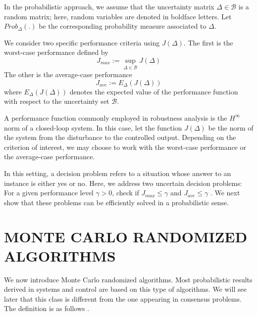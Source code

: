 \documentclass[12pt]{article}
\begin{document}
		\par
		In the probabilistic approach, we assume that the uncertainty matrix $\Delta \in \mathscr{B}$ is a random matrix; here, random variables are denoted in boldface letters. Let $Prob_{\Delta}(.)$ be the corresponding probability measure associated to $\Delta$.
		\par
		We consider two specific performance criteria using $J(\Delta )$. The first is the worst-case performance defined by 
		\begin{equation} 	
			J_{max}:= \sup_{\Delta \in \mathscr{B} }J(\Delta ) 
		\end{equation}
		The other is the average-case performance 
		\begin{equation*} 	
			J_{ave}:= E_{\Delta}(J(\Delta )) 
		\end{equation*}
		where $E_{\Delta}(J(\Delta ))$ denotes the expected value of the performance function with respect to the uncertainty set $\mathscr{B}$.
		\par
		A performance function commonly employed in robustness  analysis is the $H^{\infty }$ norm of a closed-loop system. In this case, let the function $J(\Delta)$ be the norm of the system from the disturbance to the controlled output. Depending on the criterion of interest, we may choose to work with the worst-case performance or the average-case performance.
		\par
		In this setting, a decision problem refers to a situation whose answer to an instance is either yes or no. Here, we address two uncertain decision problems: For a given performance level $\gamma > 0$, check if $J_{max} \leq \gamma $ and $J_{ave} \leq \gamma$ . We next show that these problems can be efficiently solved in a probabilistic sense.
		
		
		\section{MONTE CARLO RANDOMIZED ALGORITHMS}
		We now introduce Monte Carlo randomized algorithms. Most probabilistic results derived in systems and control are based on this type of algorithms. We will see later that this class is different from the one appearing in consensus problems. The definition is as follows \cite{bib17}.
		\par
		
\end{document}
